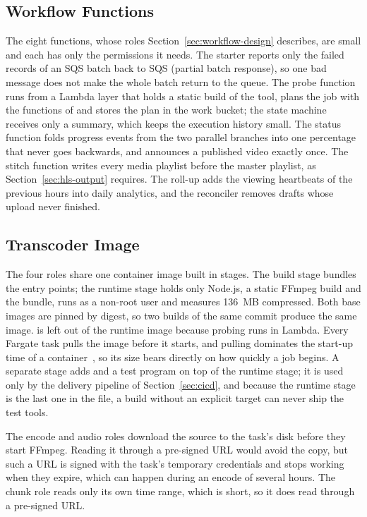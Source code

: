 \subsection{Workflow Functions}
\label{sec:functions-impl}

The eight functions, whose roles Section~\ref{sec:workflow-design} describes, are small and each
has only the permissions it needs. The starter reports only the failed records of an SQS batch back
to SQS (partial batch response), so one bad message does not make the whole batch return to the
queue. The probe function runs  from a Lambda layer that holds a static build of the
tool, plans the job with the functions of  and stores the plan in the work bucket; the
state machine receives only a summary, which keeps the execution history small. The status function
folds progress events from the two parallel branches into one percentage that never goes backwards,
and announces a published video exactly once. The stitch function writes every media playlist before
the master playlist, as Section~\ref{sec:hls-output} requires. The roll-up adds the viewing
heartbeats of the previous hours into daily analytics, and the reconciler removes drafts whose
upload never finished.

\subsection{Transcoder Image}
\label{sec:image-impl}

The four roles share one container image built in stages. The build stage bundles the entry points;
the runtime stage holds only Node.js, a static FFmpeg build and the bundle, runs as a non-root user and
measures 136~MB compressed. Both base images are pinned by digest, so two builds of the same commit
produce the same image.  is left out of the runtime image because probing runs in
Lambda. Every Fargate task pulls the image before it starts, and pulling dominates the start-up time
of a container~\cite{coldstart2023}, so its size bears directly on how quickly a job begins. A separate
 stage adds  and a test program on top of the runtime stage; it is used
only by the delivery pipeline of Section~\ref{sec:cicd}, and because the runtime stage is the last one
in the file, a build without an explicit target can never ship the test tools.

The encode and audio roles download the source to the task's disk before they start FFmpeg. Reading
it through a pre-signed URL would avoid the copy, but such a URL is signed with the task's temporary
credentials and stops working when they expire, which can happen during an encode of several hours.
The chunk role reads only its own time range, which is short, so it does read through a pre-signed
URL.

